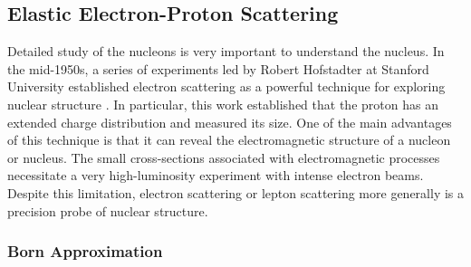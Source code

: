 \subsection{Elastic Electron-Proton Scattering}
Detailed study of the nucleons is very important to understand the nucleus. In the mid-1950s, a series of experiments led by Robert Hofstadter at Stanford University established electron scattering as a powerful technique for exploring nuclear structure \cite{10,11,12}. In particular, this work established that the proton has an extended charge distribution and measured its size. One of the main advantages of this technique is that it can reveal the electromagnetic structure of a nucleon or nucleus. The small cross-sections associated with electromagnetic processes necessitate a very high-luminosity experiment with intense electron beams. Despite this limitation, electron scattering or lepton scattering more generally is a precision probe of nuclear structure.
\subsubsection{Born Approximation}
\vspace{0.50cm}

